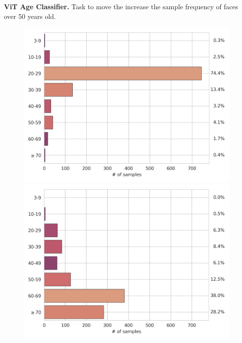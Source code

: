 \noindent \textbf{ViT Age Classifier.} Task to move the increase the sample frequency of faces over 50 years old.

\begin{figure}[ht]
  \centering
  \begin{minipage}{0.5\textwidth}
    \centering
    \includegraphics[width=1\textwidth]{img/results/age-dist-ddpm-celebahqsample-based-on-vit-age-preds-on-faces.png} %
  \end{minipage}\hfill
  \begin{minipage}{0.5\textwidth}
    \centering
    \includegraphics[width=1\textwidth]{img/results/age-dist-ddpo-celebahqsample-based-on-vit-age-preds-on-faces.png} %

\end{minipage}
\end{figure}
